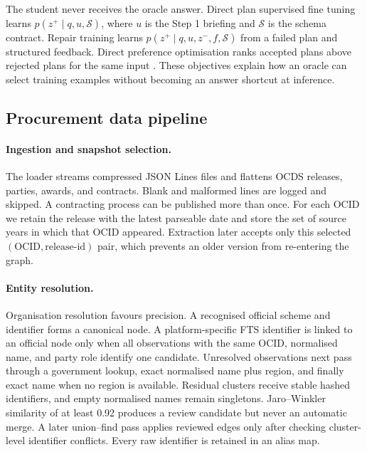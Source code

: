 The student never receives the oracle answer.  Direct plan supervised fine tuning learns
$p(z^+\mid q,u,\mathcal{S})$, where $u$ is the Step 1 briefing and $\mathcal{S}$ is the schema
contract.  Repair training learns $p(z^+\mid q,u,z^-,f,\mathcal{S})$ from a failed plan and
structured feedback.  Direct preference optimisation ranks accepted plans above rejected plans for
the same input \citep{rafailov2023dpo}.  These objectives explain how an oracle can select training
examples without becoming an answer shortcut at inference.

\subsection{Procurement data pipeline}
\label{sec:m-data}

\paragraph{Ingestion and snapshot selection.}
The loader streams compressed JSON Lines files and flattens OCDS releases, parties, awards, and
contracts.  Blank and malformed lines are logged and skipped.  A contracting process can be
published more than once.  For each OCID we retain the release with the latest parseable date and
store the set of source years in which that OCID appeared.  Extraction later accepts only this
selected $(\text{OCID},\text{release-id})$ pair, which prevents an older version from re-entering
the graph.

\paragraph{Entity resolution.}
Organisation resolution favours precision.  A recognised official scheme and identifier forms a
canonical node.  A platform-specific FTS identifier is linked to an official node only when all
observations with the same OCID, normalised name, and party role identify one candidate.  Unresolved
observations next pass through a government lookup, exact normalised name plus region, and finally
exact name when no region is available.  Residual clusters receive stable hashed identifiers, and
empty normalised names remain singletons.  Jaro--Winkler similarity of at least 0.92 produces a
review candidate but never an automatic merge.  A later union--find pass applies reviewed edges
only after checking cluster-level identifier conflicts.  Every raw identifier is retained in an
alias map.

